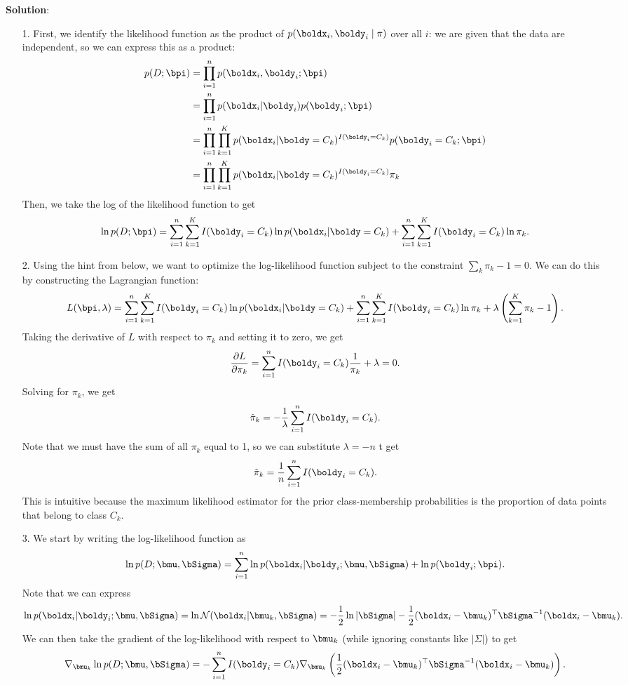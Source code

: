 \documentclass[submit]{../harvardml}
\newenvironment{solution}{
    \vspace{2mm}
    \color{blue}\noindent\textbf{Solution}:
}{}
\begin{document}
\begin{solution}
	\begin{itemize}
    \item[1.] First, we identify the likelihood function as the product of $p(\boldx_i, \boldy_i \mid \mathbf{\pi})$ over all $i$: we are given that the data are independent, so we can express this as a product:
    \begin{align*}
    p(D;\bpi) &= \prod_{i=1}^n p(\boldx_i, \boldy_i; \bpi) \\
    &= \prod_{i=1}^n p(\boldx_i | \boldy_i) p(\boldy_i; \bpi) \\
    &= \prod_{i=1}^n \prod_{k=1}^K p(\boldx_i | \boldy = C_k)^{I(\boldy_i = C_k)} p(\boldy_i = C_k;\bpi) \\
    &= \prod_{i=1}^n \prod_{k=1}^K p(\boldx_i | \boldy = C_k)^{I(\boldy_i = C_k)} \pi_k \\
    \end{align*}
    Then, we take the log of the likelihood function to get
    $$
    \ln p(D;\bpi) = \sum_{i=1}^n \sum_{k=1}^K I(\boldy_i = C_k) \ln p(\boldx_i | \boldy = C_k) + \sum_{i=1}^n \sum_{k=1}^K I(\boldy_i = C_k) \ln \pi_k.
    $$
    \item[2.] Using the hint from below, we want to optimize the log-likelihood function subject to the constraint $\sum_k \pi_k - 1 = 0$. We can do this by constructing the Lagrangian function:
    $$
    L(\bpi, \lambda) = \sum_{i=1}^n \sum_{k=1}^K I(\boldy_i = C_k) \ln p(\boldx_i | \boldy = C_k) + \sum_{i=1}^n \sum_{k=1}^K I(\boldy_i = C_k) \ln \pi_k + \lambda \left(\sum_{k=1}^K \pi_k - 1\right).
    $$
    Taking the derivative of $L$ with respect to $\pi_k$ and setting it to zero, we get
    $$
    \frac{\partial L}{\partial \pi_k} = \sum_{i=1}^n I(\boldy_i = C_k) \frac{1}{\pi_k} + \lambda = 0.
    $$
    Solving for $\pi_k$, we get
    $$
    \hat{\pi}_k = -\frac{1}{\lambda} \sum_{i=1}^n I(\boldy_i = C_k).
    $$
    Note that we must have the sum of all $\pi_k$ equal to 1, so we can substitute $\lambda = -n$ t get 
    $$
    \hat{\pi}_k = \frac{1}{n} \sum_{i=1}^n I(\boldy_i = C_k).
    $$
    This is intuitive because the maximum likelihood estimator for the prior class-membership probabilities is the proportion of data points that belong to class $C_k$.
    \item[3.] We start by writing the log-likelihood function as
    $$
    \ln p(D; \bmu, \bSigma) = \sum_{i=1}^n \ln p(\boldx_i | \boldy_i; \bmu, \bSigma) + \ln p(\boldy_i; \bpi).
    $$
    Note that we can express
    $$
    \ln p(\boldx_i | \boldy_i; \bmu, \bSigma) = \ln \mathcal{N}(\boldx_i | \bmu_k, \bSigma) = -\frac{1}{2} \ln |\bSigma| - \frac{1}{2} (\boldx_i - \bmu_k)^\top \bSigma^{-1} (\boldx_i - \bmu_k).
    $$
    We can then take the gradient of the log-likelihood with respect to $\bmu_k$ (while ignoring constants like $|\Sigma|$) to get
    $$
    \nabla_{\bmu_k} \ln p(D; \bmu, \bSigma) = -\sum_{i=1}^n I(\boldy_i = C_k) \nabla_{\bmu_k} \left( \frac{1}{2} (\boldx_i - \bmu_k)^\top \bSigma^{-1} (\boldx_i - \bmu_k)\right).
    $$


\end{itemize}
\end{solution}
\end{document}

